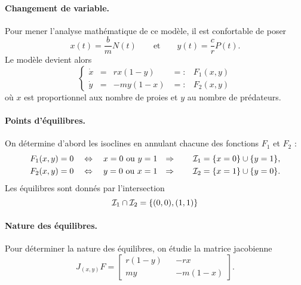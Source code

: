 \paragraph*{Changement de variable.}
Pour mener l'analyse mathématique de ce modèle, il est confortable de poser
$$
x(t) = \frac{b}m N(t)
\qquad \text{et} \qquad
y(t) = \frac{c}r P(t).
$$
Le modèle devient alors
$$
\left\{\begin{array}{rcrcl} 
  \dot x & = & r x (1-y) & =: & F_1(x, y) \\
  \dot y & = & -m y (1-x) & =: & F_2(x, y)
\end{array}\right.
$$
où $x$ est proportionnel aux nombre de proies et $y$ au nombre de prédateurs.

\paragraph*{Points d'équilibres.}
On détermine d'abord les isoclines en annulant chacune des fonctions $F_1$ et $F_2$ :
\begin{align*}
  F_1(x, y) & = 0 \quad \Leftrightarrow \quad x = 0 \text{ ou } y = 1 &
  \Rightarrow \qquad \mathcal{I}_1 & = \{x = 0\} \cup \{y = 1\}, \\
  F_2(x, y) & = 0 \quad \Leftrightarrow \quad y = 0 \text{ ou } x = 1 &
  \Rightarrow \qquad \mathcal{I}_2 & = \{x = 1\} \cup \{y = 0\}.
\end{align*}
Les équilibres sont donnés par l'intersection 
$$
\mathcal{I}_1 \cap \mathcal{I}_2 = \{(0, 0), (1, 1)\}
$$

\paragraph*{Nature des équilibres.}
Pour déterminer la nature des équilibres, on étudie la matrice jacobienne
$$
J_{(x, y)}F = 
  \left[\begin{array}{ccc} 
    r (1-y) & & -r x \\
    m y & & -m (1-x)
  \end{array}\right].
$$

